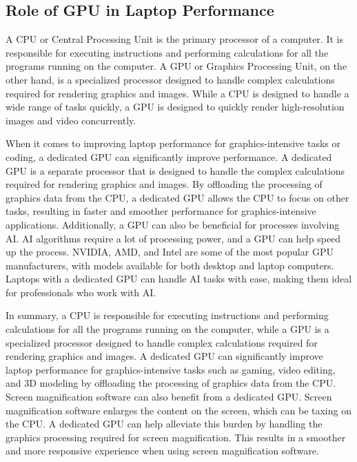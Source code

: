 \pagebreak	\hypertarget{gpu-needs}{}\subsection{Role of GPU in Laptop Performance}\label{gpu-needs}
A CPU or Central Processing Unit is the primary processor of a computer. It is responsible for executing instructions and performing calculations for all the programs running on the computer. A GPU or Graphics Processing Unit, on the other hand, is a specialized processor designed to handle complex calculations required for rendering graphics and images. While a CPU is designed to handle a wide range of tasks quickly, a GPU is designed to quickly render high-resolution images and video concurrently.

When it comes to improving laptop performance for graphics-intensive tasks or coding, a dedicated GPU can significantly improve performance. A dedicated GPU is a separate processor that is designed to handle the complex calculations required for rendering graphics and images. By offloading the processing of graphics data from the CPU, a dedicated GPU allows the CPU to focus on other tasks, resulting in faster and smoother performance for graphics-intensive applications. Additionally, a GPU can also be beneficial for processes involving AI. AI algorithms require a lot of processing power, and a GPU can help speed up the process. NVIDIA, AMD, and Intel are some of the most popular GPU manufacturers, with models available for both desktop and laptop computers. Laptops with a dedicated GPU can handle AI tasks with ease, making them ideal for professionals who work with AI.

In summary, a CPU is responsible for executing instructions and performing calculations for all the programs running on the computer, while a GPU is a specialized processor designed to handle complex calculations required for rendering graphics and images. A dedicated GPU can significantly improve laptop performance for graphics-intensive tasks such as gaming, video editing, and 3D modeling by offloading the processing of graphics data from the CPU. Screen magnification software can also benefit from a dedicated GPU. Screen magnification software enlarges the content on the screen, which can be taxing on the CPU. A dedicated GPU can help alleviate this burden by handling the graphics processing required for screen magnification. This results in a smoother and more responsive experience when using screen magnification software.

